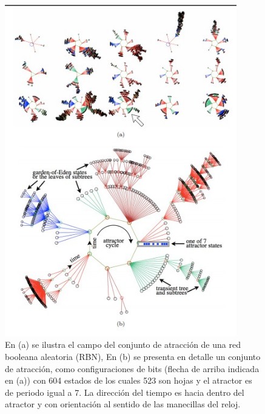 \documentclass[12pt,a4paper]{book}
\begin{document}
		\begin{figure}[H]
		\centering
		\includegraphics[width=0.9\textwidth]{atractoresSistemasDinamicos}
		\caption{En (a) se ilustra el campo del conjunto de atracción de una red
booleana aleatoria (RBN), En (b) se presenta en detalle un conjunto de atracción, como configuraciones de bits (flecha de arriba indicada en (a)) con 604 estados de los cuales 523 son hojas y el atractor es de periodo igual a 7. La
dirección del tiempo es hacia dentro del atractor y con orientación al sentido de
las manecillas del reloj.
}
	\end{figure}
	
	
\end{document}
